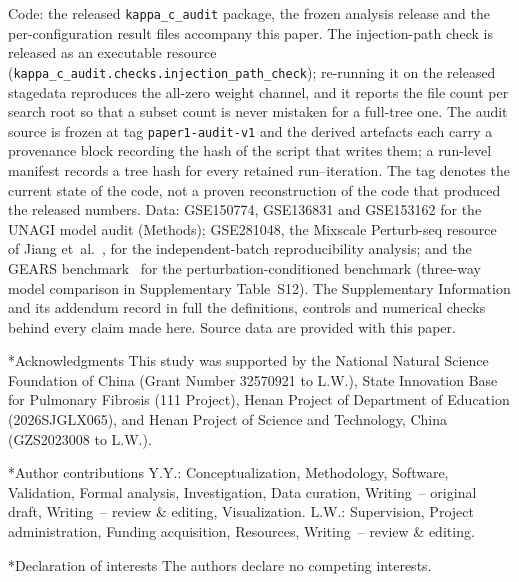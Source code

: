 \documentclass[11pt,a4paper]{article}
\makeatletter
\renewcommand{\section}{\@startsection{section}{1}{0pt}{12pt plus 6pt}{6pt}{\large\bfseries}}
\makeatother
\begin{document}
Code: the released \texttt{kappa\_c\_audit} package, the frozen analysis release and the
per-configuration result files accompany this paper. The injection-path check is released as
an executable resource (\texttt{kappa\_c\_audit.checks.injection\_path\_check}); re-running it on the
released stagedata reproduces the all-zero weight channel, and it reports the file count per search
root so that a subset count is never mistaken for a full-tree one. The audit source is frozen at tag \texttt{paper1-audit-v1} and the derived artefacts each carry a
provenance block recording the hash of the script that writes them; a run-level manifest records a tree
hash for every retained run--iteration. The tag denotes the current state of the code, not a proven
reconstruction of the code that produced the released numbers.
Data: GSE150774, GSE136831 and GSE153162 for the UNAGI model audit (Methods);
GSE281048, the Mixscale Perturb-seq resource of Jiang et~al.~\cite{jiang2025}, for the
independent-batch reproducibility analysis; and the GEARS benchmark~\cite{roohani2024} for
the perturbation-conditioned benchmark (three-way model comparison in Supplementary
Table~S12). The Supplementary Information and its addendum record in full the definitions,
controls and numerical checks behind every claim made here. Source data are provided with
this paper.

\section*{Acknowledgments}
This study was supported by the National Natural Science Foundation of China (Grant Number 32570921 to L.W.), State Innovation Base for Pulmonary Fibrosis (111 Project), Henan Project of Department of Education (2026SJGLX065), and Henan Project of Science and Technology, China (GZS2023008 to L.W.).

\section*{Author contributions}
Y.Y.: Conceptualization, Methodology, Software, Validation, Formal analysis, Investigation, Data curation, Writing~-- original draft, Writing~-- review \& editing, Visualization. L.W.: Supervision, Project administration, Funding acquisition, Resources, Writing~-- review \& editing.

\section*{Declaration of interests}
The authors declare no competing interests.
\end{document}
